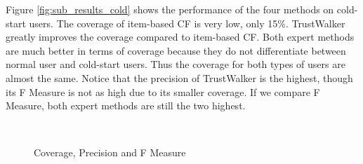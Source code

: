 \documentclass[12pt]{article}
\begin{document}
Figure \ref{fig:sub_results_cold} shows the performance of the four methods on cold-start users. The coverage of item-based CF is very low, only 15\%. TrustWalker greatly improves the coverage compared to item-based CF. Both expert methods are much better in terms of coverage because they do not differentiate between normal user and cold-start users. Thus the coverage for both types of users are almost the same. Notice that the precision of TrustWalker is the highest, though its F Measure is not as high due to its smaller coverage. If we compare F Measure, both expert methods are still the two highest.


\begin{figure}[htbp]
	\centering
	\\
	\caption{Coverage, Precision and F Measure}
	\label{fig:results_all}
\end{figure}
\end{document}
